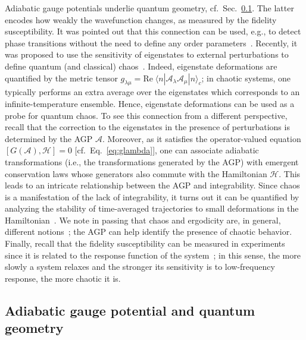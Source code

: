 Adiabatic gauge potentials underlie quantum geometry, cf.~Sec.~\ref{outlook_sec_geometry}. The latter encodes how weakly the wavefunction changes, as measured by the fidelity susceptibility. It was pointed out that this connection can be used, e.g., to detect phase transitions without the need to define any order parameters~\cite{venuti2007quantum,gu2010fidelity}. 
Recently, it was proposed to use the sensitivity of eigenstates to external perturbations to define quantum (and classical) chaos~\cite{pandey2020adiabatic}. Indeed, eigenstate deformations are quantified by the metric tensor $g_{\lambda\mu}= \text{Re}\; \langle n|\mathcal{A}_\lambda \mathcal{A}_\mu|n\rangle_c$; in chaotic systems, one typically performs an extra average over the eigenstates which corresponds to an infinite-temperature ensemble. Hence, eigenstate deformations can be used as a probe for quantum chaos.
To see this connection from a different perspective, recall that the correction to the eigenstates in the presence of perturbations is determined by the AGP $\mathcal{A}$. Moreover, as it satisfies the operator-valued equation $[G(\mathcal A),\mathcal H]=0$ [cf.~Eq.~\eqref{eq:glambda}], one can associate adiabatic transformations (i.e., the transformations generated by the AGP) with emergent conservation laws whose generators also commute with the Hamiltonian $\mathcal{H}$. This leads to an intricate relationship between the AGP and integrability. Since chaos is a manifestation of the lack of integrability, it turns out it can be quantified by analyzing the stability of time-averaged trajectories to small deformations in the Hamiltonian~\cite{lim2024defining}. We note in passing that chaos and ergodicity are, in general, different notions~\cite{kim2024integrability}; the AGP can help identify the presence of chaotic behavior. 
Finally, recall that the fidelity susceptibility can be measured in experiments since it is related to the response function of the system~\cite{kolodrubetz2017geometry}; in this sense, the more slowly a system relaxes and the stronger its sensitivity is to low-frequency response, the more chaotic it is. 

\subsection{Adiabatic gauge potential and quantum geometry} 
\label{outlook_sec_geometry}

